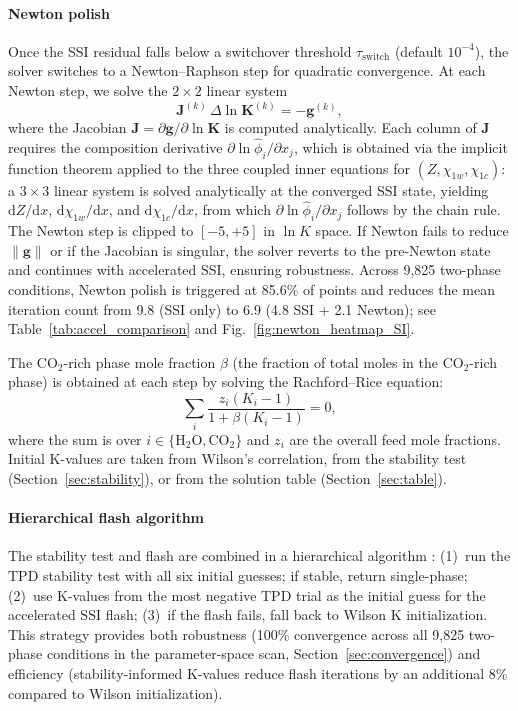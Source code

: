 \documentclass[preprint,12pt,authoryear]{elsarticle}
\begin{document}
\paragraph{Newton polish}
Once the SSI residual falls below a switchover threshold $\tau_\text{switch}$ (default $10^{-4}$),
the solver switches to a Newton--Raphson step for quadratic convergence.
At each Newton step, we solve the $2\times 2$ linear system
\begin{equation}
  \mathbf{J}^{(k)}\,\Delta\ln\mathbf{K}^{(k)} = -\mathbf{g}^{(k)},
  \label{eq:newton}
\end{equation}
where the Jacobian $\mathbf{J} = \partial\mathbf{g}/\partial\ln\mathbf{K}$ is computed
analytically.
Each column of $\mathbf{J}$ requires the composition derivative $\partial\ln\hat{\phi}_i/\partial x_j$,
which is obtained via the implicit function theorem applied to the three coupled inner equations
for $(Z, \chi_{1w}, \chi_{1c})$: a $3\times 3$ linear system is solved analytically at the
converged SSI state, yielding $\mathrm{d}Z/\mathrm{d}x$, $\mathrm{d}\chi_{1w}/\mathrm{d}x$,
and $\mathrm{d}\chi_{1c}/\mathrm{d}x$, from which $\partial\ln\hat{\phi}_i/\partial x_j$
follows by the chain rule.
The Newton step is clipped to $[-5, +5]$ in $\ln K$ space.
If Newton fails to reduce $\|\mathbf{g}\|$ or if the Jacobian is singular,
the solver reverts to the pre-Newton state and continues with accelerated SSI,
ensuring robustness.
Across 9{,}825 two-phase conditions, Newton polish is triggered at 85.6\% of points and
reduces the mean iteration count from 9.8 (SSI only) to 6.9 (4.8 SSI + 2.1 Newton);
see Table~\ref{tab:accel_comparison} and Fig.~\ref{fig:newton_heatmap_SI}.

The CO$_2$-rich phase mole fraction $\beta$ (the fraction of total moles in the CO$_2$-rich
phase) is obtained at each step by solving the Rachford--Rice equation:
\begin{equation}
  \sum_{i} \frac{z_i(K_i - 1)}{1 + \beta(K_i - 1)} = 0,
  \label{eq:rr}
\end{equation}
where the sum is over $i \in \{\text{H}_2\text{O}, \text{CO}_2\}$ and
$z_i$ are the overall feed mole fractions.
Initial K-values are taken from Wilson's correlation, from the stability test
(Section~\ref{sec:stability}), or from the solution table (Section~\ref{sec:table}).

\paragraph{Hierarchical flash algorithm}
The stability test and flash are combined in a hierarchical algorithm
\citep{Jex2024}: (1)~run the TPD stability test with all six initial guesses;
if stable, return single-phase; (2)~use K-values from the most negative TPD
trial as the initial guess for the accelerated SSI flash; (3)~if the flash
fails, fall back to Wilson K initialization.
This strategy provides both robustness (100\% convergence across all 9{,}825 two-phase
conditions in the parameter-space scan, Section~\ref{sec:convergence}) and efficiency
(stability-informed K-values reduce flash iterations by an additional 8\% compared to
Wilson initialization).
\end{document}
